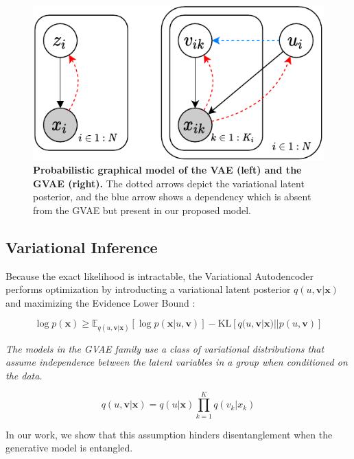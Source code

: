 \documentclass[nohyperref]{article}
\theoremstyle{plain}
\theoremstyle{definition}
\theoremstyle{remark}
\begin{document}
\begin{figure}[ht]
    \vskip 0.2in
    \begin{center}
    \centerline{\includegraphics[width=\columnwidth]{files/bayes_net.pdf}}
    \caption{\textbf{Probabilistic graphical model of the VAE (left) and the GVAE (right).} The dotted arrows depict the variational latent posterior, and the blue arrow shows a dependency which is absent from the GVAE but present in our proposed model.}
    \label{bayes-net}
    \end{center}
    \vskip -0.2in
\end{figure}

\subsection{Variational Inference}

Because the exact likelihood is intractable, the Variational Autodencoder \citep{Kingma2014AutoEncodingVB,JimenezRezende2014StochasticBA} performs optimization by introducting a variational latent posterior $q(u, \mathbf{v} | \mathbf{x})$ and maximizing the Evidence Lower Bound \citep{Jordan2004AnIT}:

$$\log p(\mathbf{x}) \geq \mathbb{E}_{q(u, \mathbf{v} | \mathbf{x})} [\log p(\mathbf{x} | u, \mathbf{v})] - \mathrm{KL} [q(u, \mathbf{v} | \mathbf{x}) || p(u, \mathbf{v})]$$

\textit{The models in the GVAE family use a class of variational distributions that assume independence between the latent variables in a group when conditioned on the data.}

$$q(u, \mathbf{v} | \mathbf{x}) = q(u | \mathbf{x}) \prod_{k=1}^K q(v_k | x_k)$$

In our work, we show that this assumption hinders disentanglement when the generative model is entangled.
\end{document}
